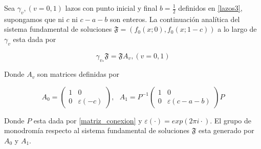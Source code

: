  \begin{thm}
 Sea $\gamma_{v}, (v=0,1) $ lazos con punto inicial y final $b=\frac{1}{2}$ definidos en \ref{lazos3}, supongamos que ni $c$ ni $c-a-b$ son enteros. La continuaci\'on anal\'itica del sistema fundamental de soluciones $\mathfrak{F}=(f_{0}(x;0),f_{0}(x;1-c))$ a lo largo de $\gamma_{v}$ esta dada por

 $$\label{sistema_soluciones_continuacion_analitica} \gamma_{v_{*}} \mathfrak{F} = \mathfrak{F} A_{v} , (v=0,1)$$

 Donde $A_{v} $ son matrices definidas por

 $$ \label{Matrices_teorema_monodromia_grupo}  A_{0} =  \begin{pmatrix}
 1& 0\\
 0& \varepsilon (-c)
 \end{pmatrix}  ,\ \ \
A_{1} = P ^{-1}\begin{pmatrix}
 1& 0\\
 0& \varepsilon (c-a-b)
 \end{pmatrix} P
$$

Donde $P$ esta dada por \ref{matriz_conexion} y $\varepsilon(\cdot) = exp(2 \pi i \cdot )$. El grupo de monodrom\'ia respecto al sistema fundamental de soluciones $\mathfrak{F} $ esta generado por $A_{0}$ y $A_{1}$.
 \end{thm}





